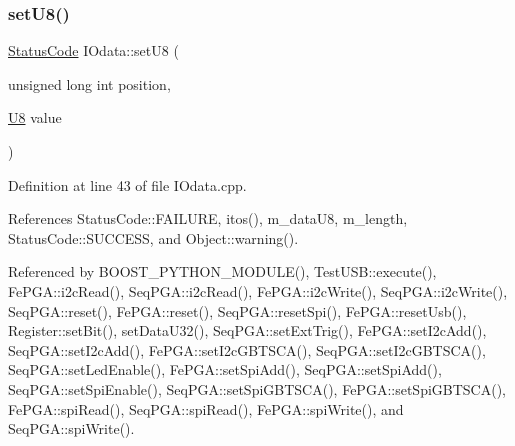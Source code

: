 \subsubsection{\texorpdfstring{set\+U8()}{setU8()}}
{\footnotesize\ttfamily \hyperlink{classStatusCode}{Status\+Code} I\+Odata\+::set\+U8 (\begin{DoxyParamCaption}\item[{unsigned long int}]{position,  }\item[{\hyperlink{classIOdata_a18d1354b7cdaf0f8a8001fdbb3ced418}{U8}}]{value }\end{DoxyParamCaption})}



Definition at line 43 of file I\+Odata.\+cpp.



References Status\+Code\+::\+F\+A\+I\+L\+U\+RE, itos(), m\+\_\+data\+U8, m\+\_\+length, Status\+Code\+::\+S\+U\+C\+C\+E\+SS, and Object\+::warning().



Referenced by B\+O\+O\+S\+T\+\_\+\+P\+Y\+T\+H\+O\+N\+\_\+\+M\+O\+D\+U\+L\+E(), Test\+U\+S\+B\+::execute(), Fe\+P\+G\+A\+::i2c\+Read(), Seq\+P\+G\+A\+::i2c\+Read(), Fe\+P\+G\+A\+::i2c\+Write(), Seq\+P\+G\+A\+::i2c\+Write(), Seq\+P\+G\+A\+::reset(), Fe\+P\+G\+A\+::reset(), Seq\+P\+G\+A\+::reset\+Spi(), Fe\+P\+G\+A\+::reset\+Usb(), Register\+::set\+Bit(), set\+Data\+U32(), Seq\+P\+G\+A\+::set\+Ext\+Trig(), Fe\+P\+G\+A\+::set\+I2c\+Add(), Seq\+P\+G\+A\+::set\+I2c\+Add(), Fe\+P\+G\+A\+::set\+I2c\+G\+B\+T\+S\+C\+A(), Seq\+P\+G\+A\+::set\+I2c\+G\+B\+T\+S\+C\+A(), Seq\+P\+G\+A\+::set\+Led\+Enable(), Fe\+P\+G\+A\+::set\+Spi\+Add(), Seq\+P\+G\+A\+::set\+Spi\+Add(), Seq\+P\+G\+A\+::set\+Spi\+Enable(), Seq\+P\+G\+A\+::set\+Spi\+G\+B\+T\+S\+C\+A(), Fe\+P\+G\+A\+::set\+Spi\+G\+B\+T\+S\+C\+A(), Fe\+P\+G\+A\+::spi\+Read(), Seq\+P\+G\+A\+::spi\+Read(), Fe\+P\+G\+A\+::spi\+Write(), and Seq\+P\+G\+A\+::spi\+Write().


